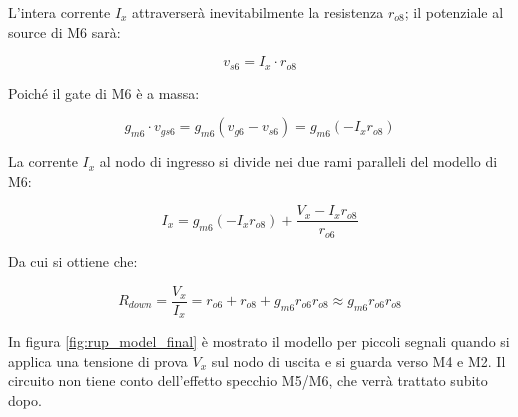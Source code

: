 \documentclass[12pt,a4paper,twoside]{report}
\begin{document}
\noindent L'intera corrente $I_x$ attraverserà inevitabilmente la resistenza $r_{o8}$; il potenziale al source di M6 sarà:

$$v_{s6} = I_x \cdot r_{o8}$$

\noindent Poiché il gate di M6 è a massa:

$$g_{m6}\cdot v_{gs6}=g_{m6}(v_{g6}-v_{s6})=g_{m6} (-I_xr_{o8})$$

\vspace{0.3cm}

\noindent La corrente $I_x$ al nodo di ingresso si divide nei due rami paralleli del modello di M6:

\vspace{0.2cm}

$$I_x = g_{m6} (-I_x r_{o8}) + \frac{V_x - I_x r_{o8}}{r_{o6}}$$

\vspace{0.2cm}

\noindent Da cui si ottiene che:

$$R_{down} = \frac{V_x}{I_x} = r_{o6} + r_{o8} + g_{m6} r_{o6} r_{o8}\approx  g_{m6} r_{o6} r_{o8}$$

\newpage

\noindent In figura \ref{fig:rup_model_final} è mostrato il modello per piccoli segnali quando si applica una
tensione di prova $V_x$ sul nodo di uscita e si guarda verso M4 e M2. Il circuito non tiene conto dell'effetto specchio M5/M6, che verrà trattato subito dopo.
\end{document}
